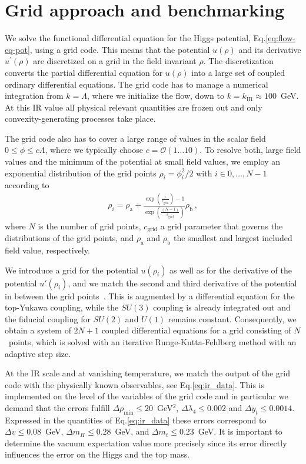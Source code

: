 \documentclass[aps,prd,11pt,tightenlines,superscriptaddress,nofootinbib,preprintnumbers,notitlepage]{revtex4-1}
\begin{document}
\section{Grid approach and benchmarking}
\label{app:grid-code}

We solve the functional differential equation for the
Higgs potential, Eq.\eqref{eq:flow-eq-pot}, using a grid code. This means that the
potential $u(\rho)$ and its derivative $u^\prime(\rho)$ are
discretized on a grid in the field invariant $\rho$. 
The discretization converts the partial differential equation for $u(\rho)$ into a large
set of coupled ordinary differential equations.  The grid code has to manage a
numerical integration from $k=\Lambda$, where we initialize the flow,
down to $k=k_\text{IR} \approx 100$~GeV. At
this IR value all physical relevant quantities are frozen out and
only convexity-generating processes take place.

The grid code also has to cover a large range of values in the scalar
field $ 0 \leq \phi \leq c \Lambda$, where we typically choose $c =
\mathcal{O}(1\dots 10)$. To resolve both, large field values and the
minimum of the potential at small field values, we employ an
exponential distribution of the grid points $\rho_i=\phi_i^2/2$ with
$i\in{0,\ldots,N-1}$ according to
%
\begin{align}
 \rho_i = \rho_\text{a} + \frac{\exp\left(\frac{i}{c_\text{grid}}\right)-1}{\exp\left(\frac{(N-1)}{c_\text{grid}}\right)}\rho_\text{b}\,,
\end{align}
%
where $N$ is the number of grid points, $c_\text{grid}$ a grid
parameter that governs the distributions of the grid points, and
$\rho_\text{a}$ and $\rho_\text{b}$ the smallest and largest included
field value, respectively.

We introduce a grid for the potential $u(\rho_i)$ as well as for the
derivative of the potential $u'(\rho_i)$, and we match the second and
third derivative of the potential in between the grid
points~\cite{grid-code}. This is augmented by a differential equation
for the top-Yukawa coupling, while the $SU(3)$ coupling is already
integrated out and the fiducial coupling for $SU(2)$ and $U(1)$
remains constant. Consequently, we obtain a system of $2N + 1$ coupled
differential equations for a grid consisting of $N$~points, which is
solved with an iterative Runge-Kutta-Fehlberg method with an adaptive
step size.\bigskip

At the IR scale and at vanishing temperature, we match the output of
the grid code with the physically known observables, see
Eq.\eqref{eq:ir_data}.  This is implemented on the level of the
variables of the grid code and in particular we demand that the errors
fulfill $\Delta \rho_\text{min} \leq 20$~GeV$^2$, $\Delta \lambda_4
\leq0.002$ and $\Delta y_t \leq 0.0014$.  Expressed in the quantities
of Eq.\eqref{eq:ir_data} these errors correspond to $\Delta v \leq
0.08$~GeV, $\Delta m_H \leq 0.28$~GeV, and $\Delta m_t \leq 0.23$~GeV.
It is important to determine the vacuum expectation value more
precisely since its error directly influences the error on the Higgs
and the top mass.
\end{document}
